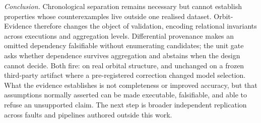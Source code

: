 \documentclass[conference]{IEEEtran}
\begin{document}
\emph{Conclusion.} Chronological separation remains necessary but cannot establish properties whose
counterexamples live outside one realised dataset. Orbit-Evidence therefore changes the object of
validation, encoding relational invariants across executions and aggregation levels. Differential provenance makes an omitted dependency falsifiable
without enumerating candidates; the unit gate asks whether dependence survives aggregation and
abstains when the design cannot decide. Both fire: on real orbital structure, and unchanged on a
frozen third-party artifact where a pre-registered correction changed model selection. What the evidence establishes is not completeness or improved accuracy,
but that assumptions normally asserted can be made executable, falsifiable, and able to refuse an
unsupported claim. The next step is broader independent replication across faults and pipelines
authored outside this work.



\end{document}
